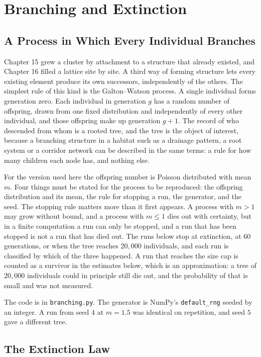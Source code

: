 \chapter{Branching and Extinction}

\section{A Process in Which Every Individual Branches}

Chapter 15 grew a cluster by attachment to a structure that already existed, and Chapter 16 filled a lattice site by site. A third way of forming structure lets every existing element produce its own successors, independently of the others. The simplest rule of this kind is the Galton--Watson process. A single individual forms generation zero. Each individual in generation $g$ has a random number of offspring, drawn from one fixed distribution and independently of every other individual, and those offspring make up generation $g+1$. The record of who descended from whom is a rooted tree, and the tree is the object of interest, because a branching structure in a habitat such as a drainage pattern, a root system or a corridor network can be described in the same terms: a rule for how many children each node has, and nothing else.

For the version used here the offspring number is Poisson distributed with mean $m$. Four things must be stated for the process to be reproduced: the offspring distribution and its mean, the rule for stopping a run, the generator, and the seed. The stopping rule matters more than it first appears. A process with $m>1$ may grow without bound, and a process with $m\le 1$ dies out with certainty, but in a finite computation a run can only be stopped, and a run that has been stopped is not a run that has died out. The runs below stop at extinction, at $60$ generations, or when the tree reaches $20{,}000$ individuals, and each run is classified by which of the three happened. A run that reaches the size cap is counted as a survivor in the estimates below, which is an approximation: a tree of $20{,}000$ individuals could in principle still die out, and the probability of that is small and was not measured.

The code is in \texttt{branching.py}. The generator is NumPy's \texttt{default\_rng} seeded by an integer. A run from seed $4$ at $m=1.5$ was identical on repetition, and seed $5$ gave a different tree.

\section{The Extinction Law}

